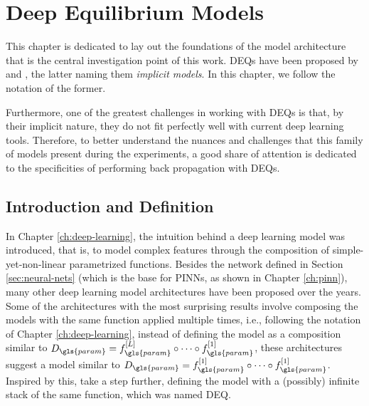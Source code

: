 \chapter{Deep Equilibrium Models}\label{ch:deq}

This chapter is dedicated to lay out the foundations of the model architecture that is the central investigation point of this work.
\gls{DEQ}s have been proposed by \textcite{Bai2019} and \textcite{Ghaoui2019}, the latter naming them \emph{implicit models}.
In this chapter, we follow the notation of the former.

Furthermore, one of the greatest challenges in working with \gls{DEQ}s is that, by their implicit nature, they do not fit perfectly well with current deep learning tools.
Therefore, to better understand the nuances and challenges that this family of models present during the experiments, a good share of attention is dedicated to the specificities of performing back propagation with \gls{DEQ}s.

\section{Introduction and Definition}\label{sec:deq-definition}

In Chapter \ref{ch:deep-learning}, the intuition behind a deep learning model was introduced, that is, to model complex features through the composition of simple-yet-non-linear parametrized functions.
Besides the network defined in Section \ref{sec:neural-nets} (which is the base for \gls{PINN}s, as shown in Chapter \ref{ch:pinn}), many other deep learning model architectures have been proposed over the years.
    Some of the architectures with the most surprising results involve composing the models with the same function applied multiple times, i.e., following the notation of Chapter \ref{ch:deep-learning}, instead of defining the model as a composition similar to $D_{\gls{param}}=f_{\gls{param}}^{[L]}\circ \cdots \circ f_{\gls{param}}^{[1]}$, these architectures suggest a model similar to $D_{\gls{param}}=f_{\gls{param}}^{[1]}\circ \cdots \circ f_{\gls{param}}^{[1]}$.
Inspired by this, \textcite{Bai2019} take a step further, defining the model with a (possibly) infinite stack of the same function, which was named \gls{DEQ}.

